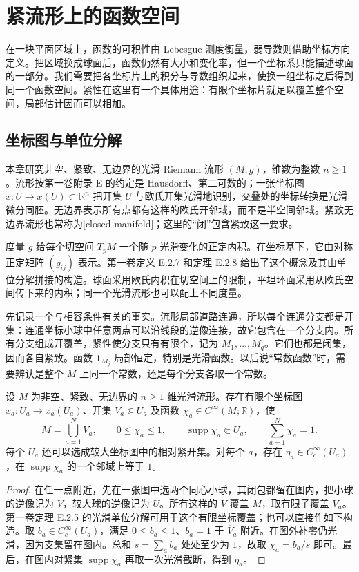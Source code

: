 \section{紧流形上的函数空间}
\label{b2:sec:2601}

在一块平面区域上，函数的可积性由 Lebesgue 测度衡量，弱导数则借助坐标方向定义。把区域换成球面后，函数仍然有大小和变化率，但一个坐标系只能描述球面的一部分。我们需要把各坐标片上的积分与导数组织起来，使换一组坐标之后得到同一个函数空间。紧性在这里有一个具体用途：有限个坐标片就足以覆盖整个空间，局部估计因而可以相加。

\subsection{坐标图与单位分解}
\label{b2:subsec:260101}

本章研究非空、紧致、无边界的光滑 Riemann 流形 \((M,g)\)，维数为整数 \(n\geq1\)。流形按第一卷附录 E 的约定是 Hausdorff、第二可数的；一张坐标图 \(x:U\to x(U)\subset\mathbb R^n\) 把开集 \(U\) 与欧氏开集光滑地识别，交叠处的坐标转换是光滑微分同胚。无边界表示所有点都有这样的欧氏开邻域，而不是半空间邻域。紧致无边界流形也常称为[closed manifold]；这里的“闭”包含紧致这一要求。

度量 \(g\) 给每个切空间 \(T_pM\) 一个随 \(p\) 光滑变化的正定内积。在坐标基下，它由对称正定矩阵 \((g_{ij})\) 表示。第一卷定义 E.2.7 和定理 E.2.8 给出了这个概念及其由单位分解拼接的构造。球面采用欧氏内积在切空间上的限制，平坦环面采用从欧氏空间传下来的内积；同一个光滑流形也可以配上不同度量。

先记录一个与相容条件有关的事实。流形局部道路连通，所以每个连通分支都是开集：连通坐标小球中任意两点可以沿线段的逆像连接，故它包含在一个分支内。所有分支组成开覆盖，紧性使分支只有有限个，记为 \(M_1,\ldots,M_q\)。它们也都是闭集，因而各自紧致。函数 \(\mathbf1_{M_j}\) 局部恒定，特别是光滑函数。以后说“常数函数”时，需要辨认是整个 \(M\) 上同一个常数，还是每个分支各取一个常数。

\begin{lemma}[有限坐标局部化]\label{b2:lem:28-finite-localization}
设 \(M\) 为非空、紧致、无边界的 \(n\geq1\) 维光滑流形。存在有限个坐标图 \(x_a:U_a\to x_a(U_a)\)、开集 \(V_a\Subset U_a\) 及函数 \(\chi_a\in C^\infty(M;\mathbb R)\)，使
\[
 M=\bigcup_{a=1}^N V_a,\qquad
 0\leq\chi_a\leq1,\qquad
 \operatorname{supp}\chi_a\Subset U_a,\qquad
 \sum_{a=1}^N\chi_a=1.
\]
每个 \(U_a\) 还可以选成较大坐标图中的相对紧开集。对每个 \(a\)，存在 \(\eta_a\in C_c^\infty(U_a)\)，在 \(\operatorname{supp}\chi_a\) 的一个邻域上等于 \(1\)。
\end{lemma}
\begin{proof}
在任一点附近，先在一张图中选两个同心小球，其闭包都留在图内，把小球的逆像记为 \(V\)，较大球的逆像记为 \(U\)。所有这样的 \(V\) 覆盖 \(M\)，取有限子覆盖 \(V_a\)。第一卷定理 E.2.5 的光滑单位分解可用于这个有限坐标覆盖；也可以直接作如下构造。取 \(b_a\in C_c^\infty(U_a)\)，满足 \(0\leq b_a\leq1\)、\(b_a=1\) 于 \(\overline V_a\) 附近。在图外补零仍光滑，因为支集留在图内。总和 \(s=\sum_a b_a\) 处处至少为 \(1\)，故取 \(\chi_a=b_a/s\) 即可。最后，在图内对紧集 \(\operatorname{supp}\chi_a\) 再取一次光滑截断，得到 \(\eta_a\)。
\end{proof}

